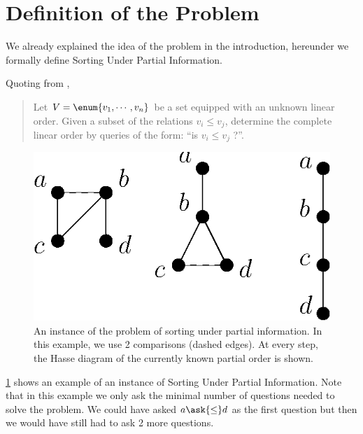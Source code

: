 \section{Definition of the Problem}

We already explained the idea of the problem in the introduction, hereunder we
formally define Sorting Under Partial Information.

Quoting from \cite{cardinal2013sorting},

\begin{quotation}
Let $V = \enum{v_1 , \cdots , v_n}$ be a set
equipped with an unknown linear order. Given a subset of the relations $v_i
\leq v_j$, determine the complete linear order by queries of the form: ``is
$v_i \leq v_j$ ?''.
\end{quotation}


\begin{figure} \centering \includegraphics[height=0.2\textheight]{fig/supi/ex2}
\caption{An instance of the problem of sorting under partial information. In
this example, we use 2 comparisons (dashed edges). At every step, the Hasse
diagram of the currently known partial order is shown.}
\label{fig:supi:def:ex2} \end{figure}


\ref{fig:supi:def:ex2} shows an example of an instance of Sorting Under Partial
Information. Note that in this example we only ask the minimal number of
questions needed to solve the problem. We could have asked $a \ask{\le}
d$ as the first question but then we would have still had to ask 2 more
questions.
